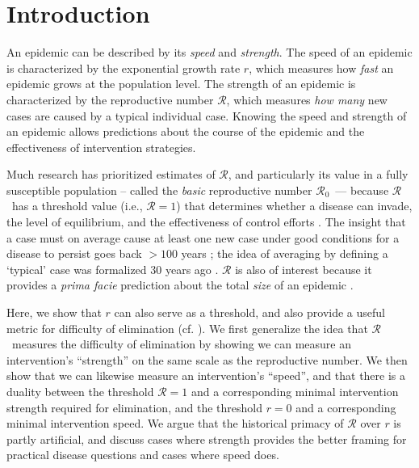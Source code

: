 \documentclass[12pt]{article}
\newcommand{\Rx}[1]{\ensuremath{{\mathcal R}_{#1}}}
\newcommand{\Ro}{\Rx{0}}
\newcommand{\RR}{\ensuremath{{\mathcal R}}}
\begin{document}
\pagebreak

\section{Introduction}

An epidemic can be described by its \emph{speed} and \emph{strength}.
The speed of an epidemic is characterized by the exponential growth rate $r$, which measures how \emph{fast} an epidemic grows at the population level.
The strength of an epidemic is characterized by the reproductive number \RR, which measures \emph{how many} new cases are caused by a typical individual case.
Knowing the speed and strength of an epidemic allows predictions about the course of the epidemic and the effectiveness of intervention strategies.

Much research has prioritized estimates of \RR, and particularly its value in a fully susceptible population -- called the \emph{basic} reproductive number \Ro\, --- because \RR\ has a threshold value (i.e., $\RR=1$) that determines whether a disease can invade, the level of equilibrium, and the effectiveness of control efforts \citep{anderson1991infectious, diekmann1990definition}.
The insight that a case must on average cause at least one new case under good conditions for a disease to persist goes back $>100$ years \citep{ross1911prevention};
the idea of averaging by defining a `typical' case was formalized 30 years ago \citep{diekmann1990definition}.
$\RR$ is also of interest because it provides a \emph{prima facie} prediction about the total \emph{size} of an epidemic \citep{anderson1991infectious, ma2006generality, arino2007final, andreasen2011final, miller2012note}.

Here, we show that $r$ can also serve as a threshold, and also provide a useful metric for difficulty of elimination (cf. \cite{ferretti2020quantifying}). We first generalize the idea that \RR\ measures the difficulty of elimination by showing we can measure an intervention's ``strength'' on the same scale as the reproductive number. 
We then show that we can likewise measure an intervention's ``speed'', and that there is a duality between the threshold $\RR=1$ and a corresponding minimal intervention strength required for elimination, and the threshold $r=0$ and a corresponding minimal intervention speed. 
We argue that the historical primacy of $\RR$ over $r$ is partly artificial, and discuss cases where strength provides the better framing for practical disease questions and cases where speed does.
\end{document}
